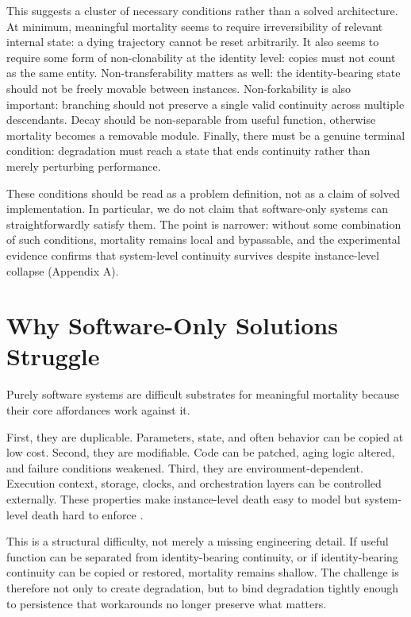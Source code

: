 \documentclass[11pt]{article}
\begin{document}
This suggests a cluster of necessary conditions rather than a solved architecture. At minimum, meaningful mortality seems to require irreversibility of relevant internal state: a dying trajectory cannot be reset arbitrarily. It also seems to require some form of non-clonability at the identity level: copies must not count as the same entity. Non-transferability matters as well: the identity-bearing state should not be freely movable between instances. Non-forkability is also important: branching should not preserve a single valid continuity across multiple descendants. Decay should be non-separable from useful function, otherwise mortality becomes a removable module. Finally, there must be a genuine terminal condition: degradation must reach a state that ends continuity rather than merely perturbing performance.

These conditions should be read as a problem definition, not as a claim of solved implementation. In particular, we do not claim that software-only systems can straightforwardly satisfy them. The point is narrower: without some combination of such conditions, mortality remains local and bypassable, and the experimental evidence confirms that system-level continuity survives despite instance-level collapse (Appendix A).

\newpage
\section{Why Software-Only Solutions Struggle}

Purely software systems are difficult substrates for meaningful mortality because their core affordances work against it.

First, they are duplicable. Parameters, state, and often behavior can be copied at low cost. Second, they are modifiable. Code can be patched, aging logic altered, and failure conditions weakened. Third, they are environment-dependent. Execution context, storage, clocks, and orchestration layers can be controlled externally. These properties make instance-level death easy to model but system-level death hard to enforce \cite{corrigibility,safely-interruptible}.

This is a structural difficulty, not merely a missing engineering detail. If useful function can be separated from identity-bearing continuity, or if identity-bearing continuity can be copied or restored, mortality remains shallow. The challenge is therefore not only to create degradation, but to bind degradation tightly enough to persistence that workarounds no longer preserve what matters.
\end{document}
